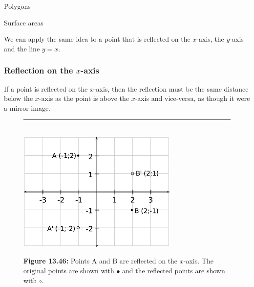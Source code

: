 \begin{exercises}{Polygons}
\begin{exercises}{Surface areas }
\begin{figure}[H]
\begin{center}
      \vspace{2pt}
    \vspace{.1in}
    
    \end{center}

 \end{figure}   

    \addtocounter{footnote}{-0}
    
        \par 
        \label{m39358*id71197}We can apply the same idea to a point that is reflected on the $x$-axis, the $y$-axis and the line $y=x$.\par 
        \label{m39358*uid7354}
            \subsubsection{ Reflection on the $x$-axis}
            \nopagebreak
            
          
          \label{m39358*id71251}If a point is reflected on the $x$-axis, then the reflection must be the same distance below the $x$-axis as the point is above the $x$-axis and vice-versa, as though it were a mirror image.\par 
          
    \setcounter{subfigure}{0}


	\begin{figure}[H] %
    \begin{center}
    \rule[.1in]{\figurerulewidth}{.005in} \\
        \label{m39358*uid7432!!!underscore!!!media}\label{m39358*uid74!!!underscore!!!printimage}\includegraphics[width=300px]{col11306.imgs/m39358_MG10C14_027.png} %
        
      \vspace{2pt}
    \vspace{\rubberspace}\par \begin{cnxcaption}
	  \small \textbf{Figure 13.46: }Points A and B are reflected on the $x$-axis. The original points are shown with $\ensuremath{\bullet}$ and the reflected points are shown with $\circ $.
	\end{cnxcaption}
      

\end{center}
\end{figure}
\end{exercises}
\end{exercises}
